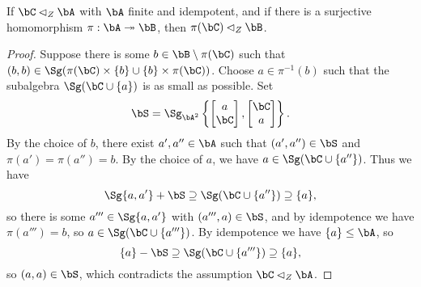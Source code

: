 \begin{prop}\label{prop-central-abs-quotient} If $\bC \lhd_Z \bA$ with $\bA$ finite and idempotent, and if there is a surjective homomorphism $\pi : \bA \twoheadrightarrow \bB$, then $\pi(\bC) \lhd_Z \bB$.
\end{prop}
\begin{proof} Suppose there is some $b \in \bB\setminus\pi(\bC)$ such that $(b,b) \in \Sg(\pi(\bC)\times \{b\} \cup \{b\} \times \pi(\bC))$. Choose $a \in \pi^{-1}(b)$ such that the subalgebra $\Sg(\bC\cup \{a\})$ is as small as possible. Set
\[
\bS = \Sg_{\bA^2}\left\{\begin{bmatrix}a\\ \bC\end{bmatrix}, \begin{bmatrix} \bC \\ a\end{bmatrix}\right\}.
\]
By the choice of $b$, there exist $a',a'' \in \bA$ such that $(a',a'') \in \bS$ and $\pi(a') = \pi(a'') = b$. By the choice of $a$, we have $a \in \Sg(\bC \cup \{a''\})$. Thus we have
\[
\Sg\{a,a'\} + \bS \supseteq \Sg(\bC \cup \{a''\}) \supseteq \{a\},
\]
so there is some $a''' \in \Sg\{a,a'\}$ with $(a''',a) \in \bS$, and by idempotence we have $\pi(a''') = b$, so $a \in \Sg(\bC \cup \{a'''\})$. By idempotence we have $\{a\} \le \bA$, so
\[
\{a\} - \bS \supseteq \Sg(\bC \cup \{a'''\}) \supseteq \{a\},
\]
so $(a,a) \in \bS$, which contradicts the assumption $\bC \lhd_Z \bA$.
\end{proof}

\begin{comment}
\begin{prop} If $\bC_1, \bC_2 \lhd_Z \bA$, then $\bC_1 \cap \bC_2 \lhd_Z \bA$. More generally, if $\bC_i \lhd_Z \bB_i \le \bA$, then $\bC_1 \cap \bC_2 \lhd_Z \bB_1 \cap \bB_2$. Similarly, if $\bC \lhd_Z \bB \lhd_Z \bA$, then $\bC \lhd_Z \bA$.
\end{prop}
\begin{proof} Consider the first statement, and let $\bC = \bC_1 \cap \bC_2$. Suppose there is some $a \in \bA$ such that $(a,a) \in \Sg(\bC\times \{a\} \cup \{a\}\times \bC)$. Then since $\bC_1 \lhd_Z \bA$ and $\bC \le \bC_1$, we must have $a \in \bC_1$, and similarly $a \in \bC_2$. The other statements are proved almost exactly the same way.
\end{proof}
\end{comment}

